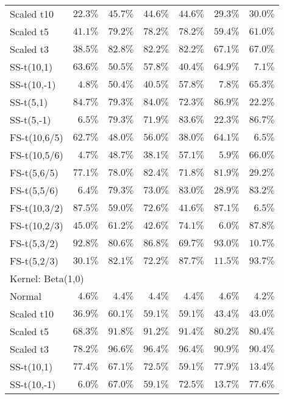 \begin{longtable}{lrrrrrr}
Scaled t10 & $22.3\%$ & $45.7\%$ & $44.6\%$ & $44.6\%$ & $29.3\%$ & $30.0\%$ \\ 
Scaled t5 & $41.1\%$ & $79.2\%$ & $78.2\%$ & $78.2\%$ & $59.4\%$ & $61.0\%$ \\ 
Scaled t3 & $38.5\%$ & $82.8\%$ & $82.2\%$ & $82.2\%$ & $67.1\%$ & $67.0\%$ \\ 
SS-t(10,1) & $63.6\%$ & $50.5\%$ & $57.8\%$ & $40.4\%$ & $64.9\%$ & $7.1\%$ \\ 
SS-t(10,-1) & $4.8\%$ & $50.4\%$ & $40.5\%$ & $57.8\%$ & $7.8\%$ & $65.3\%$ \\ 
SS-t(5,1) & $84.7\%$ & $79.3\%$ & $84.0\%$ & $72.3\%$ & $86.9\%$ & $22.2\%$ \\ 
SS-t(5,-1) & $6.5\%$ & $79.3\%$ & $71.9\%$ & $83.6\%$ & $22.3\%$ & $86.7\%$ \\ 
FS-t(10,6/5) & $62.7\%$ & $48.0\%$ & $56.0\%$ & $38.0\%$ & $64.1\%$ & $6.5\%$ \\ 
FS-t(10,5/6) & $4.7\%$ & $48.7\%$ & $38.1\%$ & $57.1\%$ & $5.9\%$ & $66.0\%$ \\ 
FS-t(5,6/5) & $77.1\%$ & $78.0\%$ & $82.4\%$ & $71.8\%$ & $81.9\%$ & $29.2\%$ \\ 
FS-t(5,5/6) & $6.4\%$ & $79.3\%$ & $73.0\%$ & $83.0\%$ & $28.9\%$ & $83.2\%$ \\ 
FS-t(10,3/2) & $87.5\%$ & $59.0\%$ & $72.6\%$ & $41.6\%$ & $87.1\%$ & $6.5\%$ \\ 
FS-t(10,2/3) & $45.0\%$ & $61.2\%$ & $42.6\%$ & $74.1\%$ & $6.0\%$ & $87.8\%$ \\ 
FS-t(5,3/2) & $92.8\%$ & $80.6\%$ & $86.8\%$ & $69.7\%$ & $93.0\%$ & $10.7\%$ \\ 
FS-t(5,2/3) & $30.1\%$ & $82.1\%$ & $72.2\%$ & $87.7\%$ & $11.5\%$ & $93.7\%$ \\ 
\midrule
\multicolumn{7}{l}{Kernel: Beta(1,0)} \\ 
\midrule
Normal & $4.6\%$ & $4.4\%$ & $4.4\%$ & $4.4\%$ & $4.6\%$ & $4.2\%$ \\ 
Scaled t10 & $36.9\%$ & $60.1\%$ & $59.1\%$ & $59.1\%$ & $43.4\%$ & $43.0\%$ \\ 
Scaled t5 & $68.3\%$ & $91.8\%$ & $91.2\%$ & $91.4\%$ & $80.2\%$ & $80.4\%$ \\ 
Scaled t3 & $78.2\%$ & $96.6\%$ & $96.4\%$ & $96.4\%$ & $90.9\%$ & $90.4\%$ \\ 
SS-t(10,1) & $77.4\%$ & $67.1\%$ & $72.5\%$ & $59.1\%$ & $77.9\%$ & $13.4\%$ \\ 
SS-t(10,-1) & $6.0\%$ & $67.0\%$ & $59.1\%$ & $72.5\%$ & $13.7\%$ & $77.6\%$ \\ 

\end{longtable}
